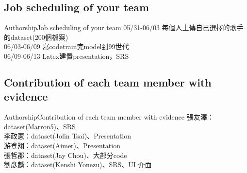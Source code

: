 \documentclass{beamer}
\begin{document}
\begin{CJK}{UTF8}{nkai}
\subsection*{Job scheduling of your team}
\begin{frame}{Authorship}{Job scheduling of your team}
05/31-06/03 每個人上傳自己選擇的歌手的dataset(200個檔案)\\
06/03-06/09 寫codetrain完model到99世代\\
06/09-06/13 Latex建置presentation，SRS
 \end{frame}

\subsection*{Contribution of each team member with evidence}
\begin{frame}{Authorship}{Contribution of each team member with evidence}
張友澤：dataset(Marron5)、SRS\\
李政憲：dataset(Jolin Tsai)、Presentation\\ 
游登翔：dataset(Aimer)、Presentation\\ 
張哲郡：dataset(Jay Chou)、大部分code\\ 
劉彥麟：dataset(Kenshi Yonezu)、SRS、UI 介面\\
 \end{frame}

\end{CJK}
\end{document}
